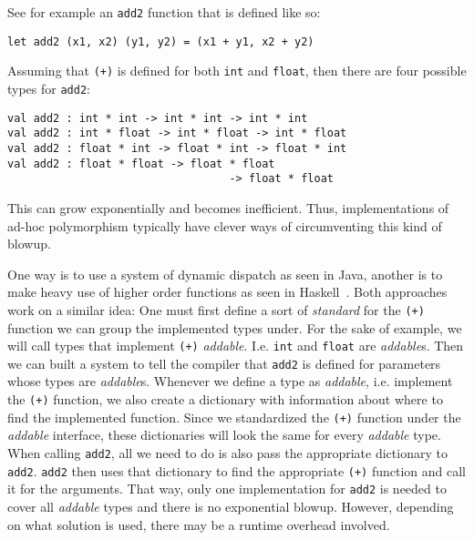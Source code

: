 See for example an \verb|add2| function that is defined like so:
\begin{verbatim}
let add2 (x1, x2) (y1, y2) = (x1 + y1, x2 + y2)
\end{verbatim}
Assuming that \verb|(+)| is defined for both \verb|int| and \verb|float|, then there are four possible types for \verb|add2|:
\begin{verbatim}
val add2 : int * int -> int * int -> int * int
val add2 : int * float -> int * float -> int * float
val add2 : float * int -> float * int -> float * int
val add2 : float * float -> float * float
                                  -> float * float
\end{verbatim}
This can grow exponentially and becomes inefficient. Thus, implementations of ad-hoc polymorphism typically have clever ways of circumventing this kind of blowup.

One way is to use a system of dynamic dispatch as seen in Java, another is to make heavy use of higher order functions as seen in Haskell~\cite{type-classes-original}. Both approaches work on a similar idea: One must first define a sort of \emph{standard} for the \verb|(+)| function we can group the implemented types under. For the sake of example, we will call types that implement \verb|(+)| \emph{addable}. I.e. \verb|int| and \verb|float| are \emph{addable}s. Then we can built a system to tell the compiler that \verb|add2| is defined for parameters whose types are \emph{addable}s. Whenever we define a type as \emph{addable}, i.e. implement the \verb|(+)| function, we also create a dictionary with information about where to find the implemented function. Since we standardized the \verb|(+)| function under the \emph{addable} interface, these dictionaries will look the same for every \emph{addable} type. When calling \verb|add2|, all we need to do is also pass the appropriate dictionary to \verb|add2|. \verb|add2| then uses that dictionary to find the appropriate \verb|(+)| function and call it for the arguments. That way, only one implementation for \verb|add2| is needed to cover all \emph{addable} types and there is no exponential blowup. However, depending on what solution is used, there may be a runtime overhead involved.
